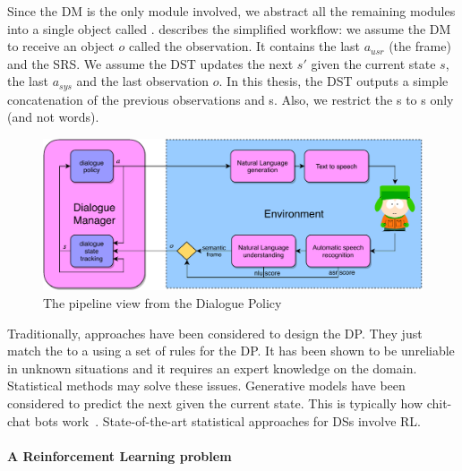 Since the \gls{DM} is the only module involved, we abstract all the remaining modules into a single object called .  describes the simplified workflow: we assume the \gls{DM} to receive an object $o$ called the observation. It contains the last   $a_{usr}$ (the  frame) and the \gls{SRS}. We assume the \gls{DST} updates the next  $s'$ given the current state $s$, the last  $a_{sys}$ and the last observation $o$. In this thesis, the \gls{DST} outputs a simple concatenation of the previous observations and s. Also, we restrict the s to s only (and not words).

\begin{figure}

    \includegraphics[width=\textwidth]{sources/pipeline/pipeline-dp}
    \caption{\label{fig:pipeline-dp} The pipeline view from the Dialogue Policy}
\end{figure}

Traditionally,  approaches have been considered to design the \gls{DP}. They just match the  to a  using a set of  rules for the \gls{DP}. It has been shown to be unreliable in unknown situations and it requires an expert knowledge on the domain. Statistical methods may solve these issues. Generative models have been considered to predict the next  given the current state. This is typically how chit-chat bots work~\parencite{serban2016building,ijcai2018-778,Gao2018-neural-approches-convertional-ai}. State-of-the-art statistical approaches for  \glspl{DS} involve \gls{RL}.


\paragraph{A Reinforcement Learning problem}

